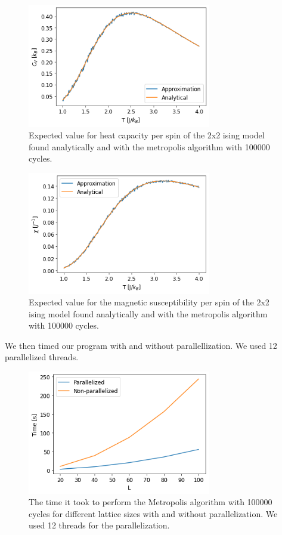 \documentclass[reprint,english,notitlepage]{revtex4-1}
\begin{document}
	\begin{figure}[H]
		\includegraphics[width=80mm]{../../Code/Figures/2x2Cv.png}
		\caption{Expected value for heat capacity per spin of the 2x2 ising model found analytically and with the metropolis algorithm with 100000 cycles.}
		\label{fig:2x2Cv}
	\end{figure}

	\begin{figure}[H]
		\includegraphics[width=80mm]{../../Code/Figures/2x2X.png}
		\caption{Expected value for the magnetic susceptibility per spin of the 2x2 ising model found analytically and with the metropolis algorithm with 100000 cycles.}
		\label{fig:2x2X}
	\end{figure}

	We then timed our program with and without parallellization. We used 12 parallelized threads.

	\begin{figure}[H]
		\includegraphics[width=80mm]{../../Code/Figures/time.png}
		\caption{The time it took to perform the Metropolis algorithm with 100000 cycles for different lattice sizes with and without parallelization. We used 12 threads for the parallelization.}
		\label{fig:time}
	\end{figure}
\end{document}
